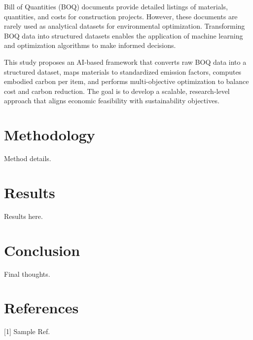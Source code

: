 \documentclass[sigconf]{acmart}
\begin{document}
Bill of Quantities (BOQ) documents provide detailed listings of materials, quantities, and costs for construction projects. However, these documents are rarely used as analytical datasets for environmental optimization. Transforming BOQ data into structured datasets enables the application of machine learning and optimization algorithms to make informed decisions.

This study proposes an AI-based framework that converts raw BOQ data into a structured dataset, maps materials to standardized emission factors, computes embodied carbon per item, and performs multi-objective optimization to balance cost and carbon reduction. The goal is to develop a scalable, research-level approach that aligns economic feasibility with sustainability objectives.

\section{Methodology}
Method details.

\section{Results}
Results here.

\section{Conclusion}
Final thoughts.

\section*{References}
[1] Sample Ref.
\end{document}
